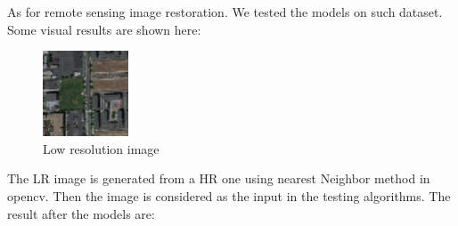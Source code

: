 \documentclass{article}
\begin{document}
  As for remote sensing image restoration.
  We tested the models on such dataset. 
  Some visual results are shown here:
  \begin{figure}[H]
      \centering
      \includegraphics[width=1in]{images/rs_LR.png}
      \caption{Low resolution image}
  \end{figure}
  The LR image is generated from a HR one using nearest Neighbor method in opencv.
  Then the image is considered as the input in the testing algorithms.
  The result after the models are:
  \begin{figure}[H]
      \centering
  

\end{figure}
\end{document}
